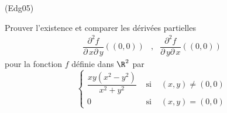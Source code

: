 \begin{tiny}(Edg05)\end{tiny}
Prouver l'existence et comparer les dérivées partielles 
\begin{align*}
\dfrac{\partial ^{2}f}{\partial \,x\partial
\,y}((0,0)) &,& \dfrac{\partial ^{2}f}{\partial \,y\partial \,x}((0,0)) 
\end{align*}
 pour la fonction $f$ d{\'e}finie dans $\R^{2}$ par
\begin{displaymath}
\left\{
\begin{aligned}
\dfrac{xy(x^{2}-y^{2})}{x^2+y^2} & \text{ si } & (x,y)\neq (0,0) \\
0 & \text{ si } & (x,y)=(0,0)
\end{aligned}
\right. 
\end{displaymath}
